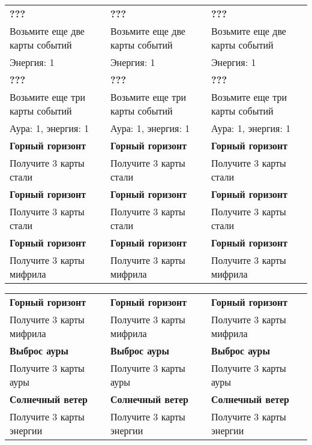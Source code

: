 \documentclass[a4paper,12pt]{article}
\begin{document}
  \begin{tabular}{|p{5cm}|p{5cm}|p{5cm}|}
    \hline
      \textbf{???} & \textbf{???} & \textbf{???} \\
      Возьмите еще две карты событий & Возьмите еще две карты событий & Возьмите еще две карты событий \\
      Энергия: 1 & Энергия: 1 & Энергия: 1 \\

    \hline
      \textbf{???} & \textbf{???} & \textbf{???} \\
      Возьмите еще три карты событий & Возьмите еще три карты событий & Возьмите еще три карты событий \\
      Аура: 1, энергия: 1 & Аура: 1, энергия: 1 & Аура: 1, энергия: 1 \\

    \hline
      \textbf{Горный горизонт} & \textbf{Горный горизонт} & \textbf{Горный горизонт} \\
      Получите 3 карты стали & Получите 3 карты стали & Получите 3 карты стали \\

    \hline
      \textbf{Горный горизонт} & \textbf{Горный горизонт} & \textbf{Горный горизонт} \\
      Получите 3 карты стали & Получите 3 карты стали & Получите 3 карты стали \\

    \hline
      \textbf{Горный горизонт} & \textbf{Горный горизонт} & \textbf{Горный горизонт} \\
      Получите 3 карты мифрила & Получите 3 карты мифрила & Получите 3 карты мифрила \\
    \hline
  \end{tabular}
  \newpage
  \begin{tabular}{|p{5cm}|p{5cm}|p{5cm}|}

    \hline
      \textbf{Горный горизонт} & \textbf{Горный горизонт} & \textbf{Горный горизонт} \\
      Получите 3 карты мифрила & Получите 3 карты мифрила & Получите 3 карты мифрила \\

    \hline
      \textbf{Выброс ауры} & \textbf{Выброс ауры} & \textbf{Выброс ауры} \\
      Получите 3 карты ауры & Получите 3 карты ауры & Получите 3 карты ауры \\

    \hline
      \textbf{Солнечный ветер} & \textbf{Солнечный ветер} & \textbf{Солнечный ветер} \\
      Получите 3 карты энергии & Получите 3 карты энергии & Получите 3 карты энергии \\
    \hline
  \end{tabular}
\end{document}
